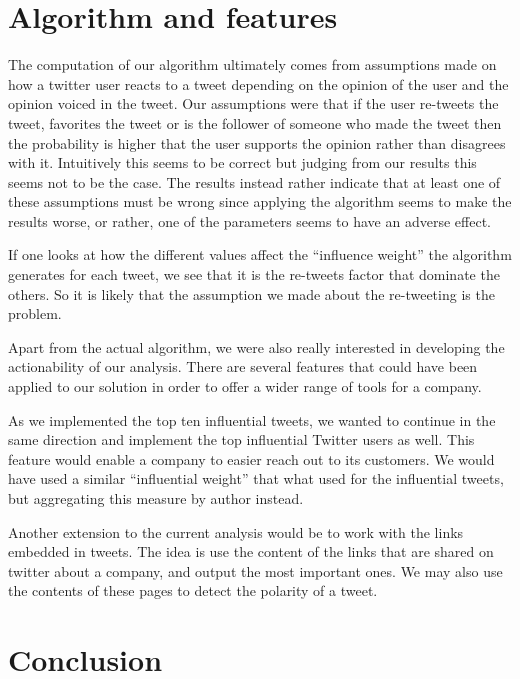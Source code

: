 \documentclass[a4paper,12pt]{report}
\begin{document}
\section{Algorithm and features}

The computation of our algorithm ultimately comes from assumptions made on how a twitter user reacts to a tweet depending on the opinion of the user and the opinion voiced in the tweet. Our assumptions were that if the user re-tweets the tweet, favorites the tweet or is the follower of someone who made the tweet then the probability is higher that the user supports the opinion rather than disagrees with it. Intuitively this seems to be correct but judging from our results this seems not to be the case. The results instead rather indicate that at least one of these assumptions must be wrong since applying the algorithm seems to make the results worse, or rather, one of the parameters seems to have an adverse effect. 

If one looks at how the different values affect the ``influence weight'' the algorithm generates for each tweet, we see that it is the re-tweets factor that dominate the others. So it is likely that the assumption we made about the re-tweeting is the problem.

Apart from the actual algorithm, we were also really interested in developing the actionability of our analysis. There are several features that could have been applied to our solution in order to offer a wider range of tools for a company.

As we implemented the top ten influential tweets, we wanted to continue in the same direction and implement the top influential Twitter users as well. This feature would enable a company to easier reach out to its customers. We would have used a similar “influential weight” that what used for the influential tweets, but aggregating this measure by author instead.

Another extension to the current analysis would be to work with the links embedded in tweets. The idea is use the content of the links that are shared on twitter about a company, and output the most important ones. We may also use the contents of these pages to detect the polarity of a tweet.

\section{Conclusion}
\end{document}
